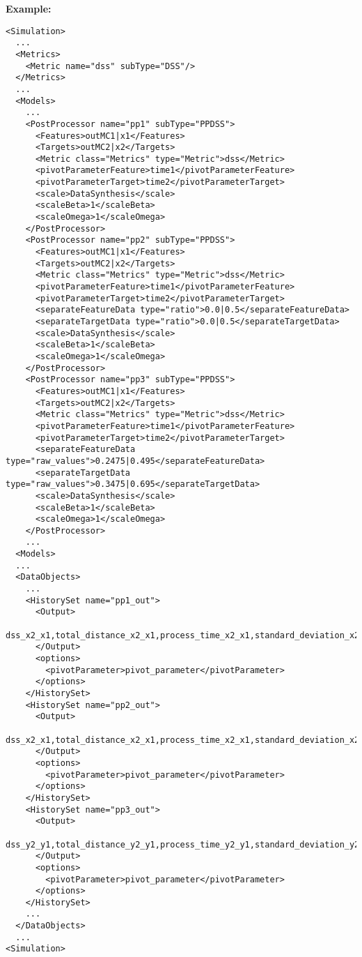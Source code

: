 \textbf{Example:}
\begin{lstlisting}[style=XML,morekeywords={subType}]
<Simulation>
  ...
  <Metrics>
    <Metric name="dss" subType="DSS"/>
  </Metrics>
  ...
  <Models>
    ...
    <PostProcessor name="pp1" subType="PPDSS">
      <Features>outMC1|x1</Features>
      <Targets>outMC2|x2</Targets>
      <Metric class="Metrics" type="Metric">dss</Metric>
      <pivotParameterFeature>time1</pivotParameterFeature>
      <pivotParameterTarget>time2</pivotParameterTarget>
      <scale>DataSynthesis</scale>
      <scaleBeta>1</scaleBeta>
      <scaleOmega>1</scaleOmega>
    </PostProcessor>
    <PostProcessor name="pp2" subType="PPDSS">
      <Features>outMC1|x1</Features>
      <Targets>outMC2|x2</Targets>
      <Metric class="Metrics" type="Metric">dss</Metric>
      <pivotParameterFeature>time1</pivotParameterFeature>
      <pivotParameterTarget>time2</pivotParameterTarget>
      <separateFeatureData type="ratio">0.0|0.5</separateFeatureData>
      <separateTargetData type="ratio">0.0|0.5</separateTargetData>
      <scale>DataSynthesis</scale>
      <scaleBeta>1</scaleBeta>
      <scaleOmega>1</scaleOmega>
    </PostProcessor>
    <PostProcessor name="pp3" subType="PPDSS">
      <Features>outMC1|x1</Features>
      <Targets>outMC2|x2</Targets>
      <Metric class="Metrics" type="Metric">dss</Metric>
      <pivotParameterFeature>time1</pivotParameterFeature>
      <pivotParameterTarget>time2</pivotParameterTarget>
      <separateFeatureData type="raw_values">0.2475|0.495</separateFeatureData>
      <separateTargetData type="raw_values">0.3475|0.695</separateTargetData>
      <scale>DataSynthesis</scale>
      <scaleBeta>1</scaleBeta>
      <scaleOmega>1</scaleOmega>
    </PostProcessor>
    ...
  <Models>
  ...
  <DataObjects>
    ...
    <HistorySet name="pp1_out">
      <Output>
          dss_x2_x1,total_distance_x2_x1,process_time_x2_x1,standard_deviation_x2_x1
      </Output>
      <options>
        <pivotParameter>pivot_parameter</pivotParameter>
      </options>
    </HistorySet>
    <HistorySet name="pp2_out">
      <Output>
          dss_x2_x1,total_distance_x2_x1,process_time_x2_x1,standard_deviation_x2_x1
      </Output>
      <options>
        <pivotParameter>pivot_parameter</pivotParameter>
      </options>
    </HistorySet>
    <HistorySet name="pp3_out">
      <Output>
          dss_y2_y1,total_distance_y2_y1,process_time_y2_y1,standard_deviation_y2_y1
      </Output>
      <options>
        <pivotParameter>pivot_parameter</pivotParameter>
      </options>
    </HistorySet>
    ...
  </DataObjects>
  ...
<Simulation>
\end{lstlisting}
